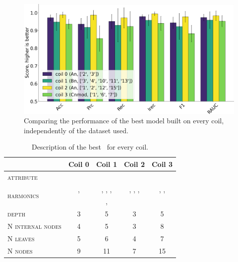 \begin{figure}[!ht]
	\centering
	\includegraphics[width=\linewidth]{img/best_dts_qlp.png}
	\caption{Comparing the performance of the best model built on every coil, independently of
		the dataset used.} \label{fig:bdts-qlp}
\end{figure}

\begin{table}[!ht]
	\caption{Description of the best \dt\ for every coil.}\label{tbl:tree-description}

	\bigskip
	\setlength{\tabcolsep}{6pt}
	\centering
	\begin{tabular}{lcccc}
		\toprule
		\textbf{}                           & \textbf{Coil 0}  & \textbf{Coil 1}          & \textbf{Coil 2}          & \textbf{Coil 3}
		\\
		\midrule
		\textsc{attribute}                  & \an              & \bn                      & \an                      & \cnmod                          \\
		\multirow{2}{*}{\textsc{harmonics}} & \an[2], \an[3]   & \bn[3], \bn[4], \bn[10], & \an[1], \an[2], \an[12], & \cnmod[1], \cnmod[6], \cnmod[7] \\
		                                    &
		                                    & \bn[11], \bn[13] & \an[15]                  &                                                            \\
		\textsc{depth}                      & 3                & 5
		                                    & 3                & 5                                                                                     \\
		\textsc{N internal nodes}           & 4                & 5
		                                    & 3                & 8                                                                                     \\
		\textsc{N leaves}                   & 5                & 6
		                                    & 4                & 7                                                                                     \\
		\textsc{N nodes}                    & 9                & 11
		                                    & 7                & 15                                                                                    \\
		\bottomrule
	\end{tabular}
\end{table}

